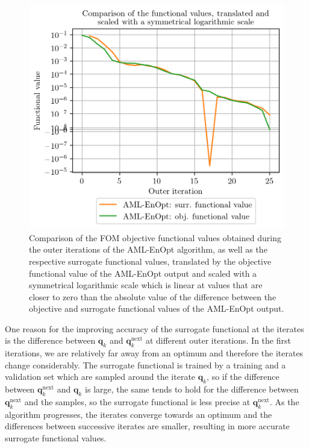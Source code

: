 \begin{figure}
\centering
\includegraphics{Plots/reducedFunctionalValueCompSymlog.png}
\caption{\label{AMLEnOptFuncValCompSymlog}Comparison of the FOM objective functional values obtained during the outer iterations of the AML-EnOpt algorithm, as well as the respective surrogate functional values, translated by the objective functional value of the AML-EnOpt output and scaled with a symmetrical logarithmic scale which is linear at values that are closer to zero than the absolute value of the difference between the objective and surrogate functional values of the AML-EnOpt output.}
\end{figure}

One reason for the improving accuracy of the surrogate functional at the iterates is the difference between $\mathbf{q}_k$ and $\mathbf{q}^\mathrm{next}_k$ at different outer iterations. In the first iterations, we are relatively far away from an optimum and therefore the iterates change considerably. The surrogate functional is trained by a training and a validation set which are sampled around the iterate $\mathbf{q}_k$, so  if the difference between $\mathbf{q}^\mathrm{next}_k$ and $\mathbf{q}_k$ is large, the same tends to hold for the difference between $\mathbf{q}^\mathrm{next}_k$ and the samples, so the surrogate functional is less precise at $\mathbf{q}^\mathrm{next}_k$. As the algorithm progresses, the iterates converge towards an optimum and the differences between successive iterates are smaller, resulting in more accurate surrogate functional values.

